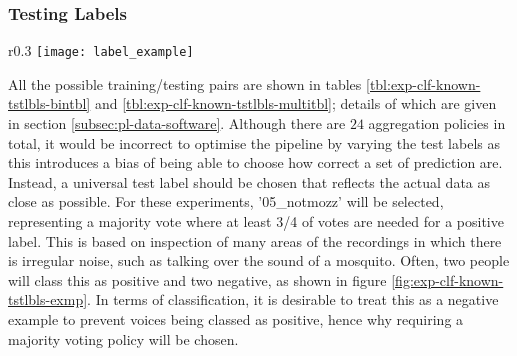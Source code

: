         \subsubsection{Testing Labels}
        \label{subsubsec:exp-clf-known-tstlbls}
            \begin{wrapfigure}{r}{0.3\textwidth}
                \centering
                \texttt{[image: label\_example]}
                \caption{An example of noise where there is $50/50$ disagreement between labellers.}
                \label{fig:exp-clf-known-tstlbls-exmp}
            \end{wrapfigure}
            All the possible training/testing pairs are shown in tables \ref{tbl:exp-clf-known-tstlbls-bintbl} and \ref{tbl:exp-clf-known-tstlbls-multitbl}; details of which are given in section \ref{subsec:pl-data-software}. Although there are $24$ aggregation policies in total, it would be incorrect to optimise the pipeline by varying the test labels as this introduces a bias of being able to choose how correct a set of prediction are. Instead, a universal test label should be chosen that reflects the actual data as close as possible. For these experiments, '05\_notmozz' will be selected, representing a majority vote where at least 3/4 of votes are needed for a positive label. This is based on inspection of many areas of the recordings in which there is irregular noise, such as talking over the sound of a mosquito. Often, two people will class this as positive and two negative, as shown in figure \ref{fig:exp-clf-known-tstlbls-exmp}. In terms of classification, it is desirable to treat this as a negative example to prevent voices being classed as positive, hence why requiring a majority voting policy will be chosen.
            

